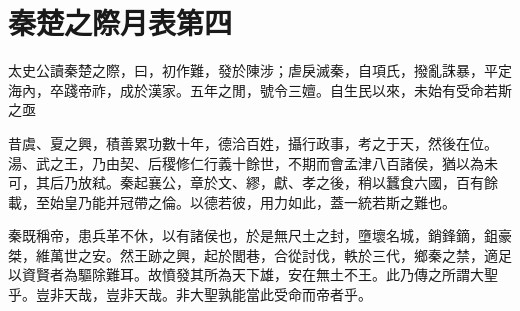\chapter{秦楚之際月表第四}
			
太史公讀秦楚之際，曰，初作難，發於陳涉；虐戾滅秦，自項氏，撥亂誅暴，平定海內，卒踐帝祚，成於漢家。五年之閒，號令三嬗。自生民以來，未始有受命若斯之亟

昔虞、夏之興，積善累功數十年，德洽百姓，攝行政事，考之于天，然後在位。湯、武之王，乃由契、后稷修仁行義十餘世，不期而會孟津八百諸侯，猶以為未可，其后乃放弒。秦起襄公，章於文、繆，獻、孝之後，稍以蠶食六國，百有餘載，至始皇乃能并冠帶之倫。以德若彼，用力如此，蓋一統若斯之難也。

秦既稱帝，患兵革不休，以有諸侯也，於是無尺土之封，墮壞名城，銷鋒鏑，鉏豪桀，維萬世之安。然王跡之興，起於閭巷，合從討伐，軼於三代，鄉秦之禁，適足以資賢者為驅除難耳。故憤發其所為天下雄，安在無土不王。此乃傳之所謂大聖乎。豈非天哉，豈非天哉。非大聖孰能當此受命而帝者乎。

